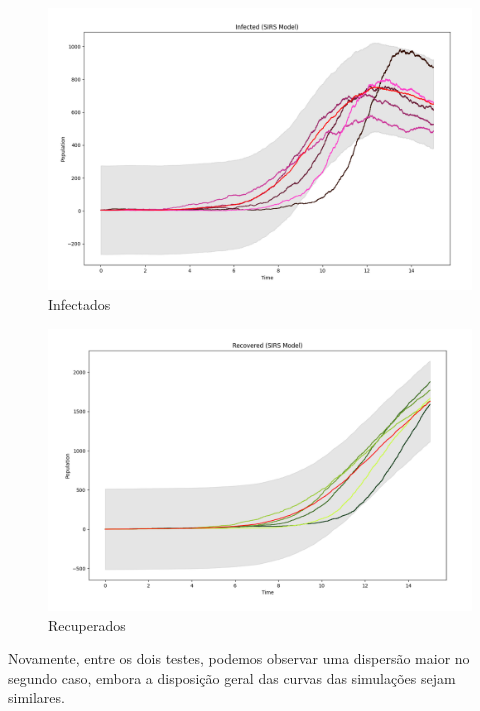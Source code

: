 \documentclass[a4paper, 12pt]{article}
\begin{document}
\begin{itemize}
    \begin{figure}[H]
        \centering
        \includegraphics[width=1\textwidth]{Images/Exercise 5/Scenario 2/i2b.png}
        \vspace*{-1cm}
        \caption{Infectados}
        \label{fig:exampleFig25}
    \end{figure}
    
    \begin{figure}[H]
        \centering
        \includegraphics[width=1\textwidth]{Images/Exercise 5/Scenario 2/r2b.png}
        \vspace*{-1cm}
        \caption{Recuperados}
        \label{fig:exampleFig26}
    \end{figure}
\end{itemize}

Novamente, entre os dois testes, podemos observar uma dispersão maior no segundo caso, embora a disposição geral das curvas das simulações sejam similares.
\end{document}
